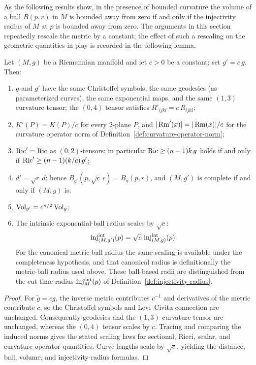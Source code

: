 As the following results show, in the presence of bounded curvature the volume
of a ball $B(p,r)$ in $M$ is bounded away from zero if and only if the
injectivity radius of $M$ at $p$ is bounded away from zero.
The arguments in this section repeatedly rescale the metric by a
constant; the effect of such a rescaling on the geometric
quantities in play is recorded in the following lemma.

\begin{lemma}
\label{lem:metric-rescaling}


Let $(M,g)$ be a Riemannian manifold and let $c>0$ be a constant;
set $g'=c\,g$. Then:
\begin{enumerate}
\item $g$ and $g'$ have the same Christoffel symbols, the same
geodesics (as parameterized curves), the same exponential maps, and
the same $(1,3)$ curvature tensor; the $(0,4)$ tensor satisfies
$R'_{ijkl}=c\,R_{ijkl}$;
\item $K'(P)=K(P)/c$ for every $2$-plane $P$, and
$|\operatorname{Rm}'(x)|=|\operatorname{Rm}(x)|/c$ for the curvature operator norm of
Definition~\ref{def:curvature-operator-norm};
\item $\operatorname{Ric}'=\operatorname{Ric}$ as $(0,2)$-tensors; in particular
$\operatorname{Ric}\ge(n-1)k\,g$ holds if and only if
$\operatorname{Ric}'\ge(n-1)(k/c)\,g'$;
\item $d'=\sqrt{c}\,d$; hence $B_{g'}(p,\sqrt{c}\,r)=B_g(p,r)$,
and $(M,g')$ is complete if and only if $(M,g)$ is;
\item $\operatorname{Vol}_{g'}=c^{n/2}\operatorname{Vol}_g$;
\item The intrinsic exponential-ball radius scales by
$\sqrt{c}$:
\[
\operatorname{inj}^{\rm int}_{(M,g')}(p)=
\sqrt{c}\,\operatorname{inj}^{\rm int}_{(M,g)}(p).
\]
For the canonical metric-ball radius the same scaling is available under
the completeness hypothesis, and that canonical radius is definitionally
the metric-ball radius used above. These ball-based radii are distinguished
from the cut-time radius $\operatorname{inj}_M^{\rm cut}(p)$ of Definition~\ref{def:injectivity-radius}.
\end{enumerate}
\end{lemma}

\begin{proof}
\sketch
{}
For $\tilde g=cg$, the inverse metric contributes $c^{-1}$ and derivatives of the metric contribute $c$, so the Christoffel symbols and Levi--Civita connection are unchanged. Consequently geodesics and the $(1,3)$ curvature tensor are unchanged, whereas the $(0,4)$ tensor scales by $c$. Tracing and comparing the induced norms gives the stated scaling laws for sectional, Ricci, scalar, and curvature-operator quantities. Curve lengths scale by $\sqrt c$, yielding the distance, ball, volume, and injectivity-radius formulas.
\end{proof}


